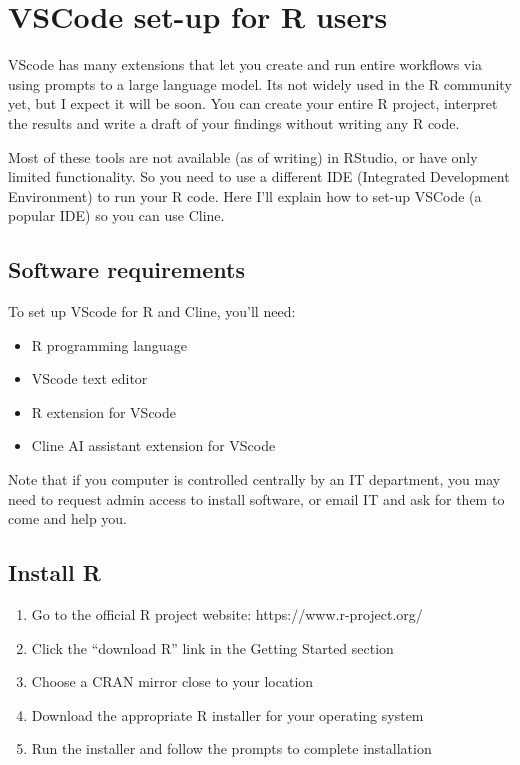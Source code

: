 \documentclass[
  letterpaper,
  DIV=11,
  numbers=noendperiod]{scrreprt}
\providecommand{\tightlist}{%
  \setlength{\itemsep}{0pt}\setlength{\parskip}{0pt}}
\begin{document}
\section{VSCode set-up for R users}\label{sec-vscodesetup}

VScode has many extensions that let you create and run entire workflows
via using prompts to a large language model. Its not widely used in the
R community yet, but I expect it will be soon. You can create your
entire R project, interpret the results and write a draft of your
findings without writing any R code.

Most of these tools are not available (as of writing) in RStudio, or
have only limited functionality. So you need to use a different IDE
(Integrated Development Environment) to run your R code. Here I'll
explain how to set-up VSCode (a popular IDE) so you can use Cline.

\subsection{Software requirements}\label{software-requirements}

To set up VScode for R and Cline, you'll need:

\begin{itemize}
\tightlist
\item
  R programming language
\item
  VScode text editor
\item
  R extension for VScode
\item
  Cline AI assistant extension for VScode
\end{itemize}

Note that if you computer is controlled centrally by an IT department,
you may need to request admin access to install software, or email IT
and ask for them to come and help you.

\subsection{Install R}\label{install-r}

\begin{enumerate}
\def\labelenumi{\arabic{enumi}.}
\tightlist
\item
  Go to the official R project website: https://www.r-project.org/
\item
  Click the ``download R'' link in the Getting Started section
\item
  Choose a CRAN mirror close to your location
\item
  Download the appropriate R installer for your operating system
\item
  Run the installer and follow the prompts to complete installation
\end{enumerate}
\end{document}
